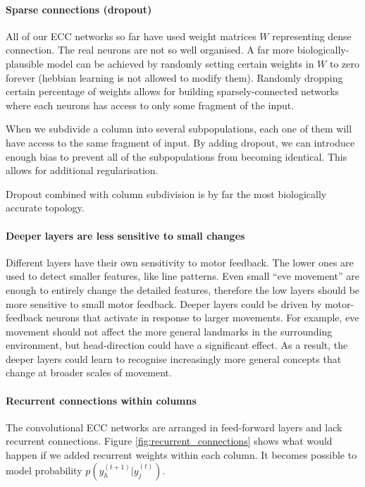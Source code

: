 \documentclass[12pt]{article}
\begin{document}
\paragraph{Sparse connections (dropout)} All of our ECC networks so far have used weight matrices $W$ representing dense connection. The real neurons are not so well organised. A far more biologically-plausible model can be achieved by randomly setting certain weights in $W$ to zero forever (hebbian learning is not allowed to modify them). 
Randomly dropping certain percentage of weights allows for building sparsely-connected networks where each neurons has access to only some fragment of the input. 

When we subdivide a column into several subpopulations, each one of them will have access to the same fragment of input. By adding dropout, we can introduce enough bias to prevent all of the subpopulations from becoming identical. This allows for additional regularisation.

Dropout combined with column subdivision is by far the most biologically accurate topology.

\paragraph{Deeper layers are less sensitive to small changes} 
Different layers have their own sensitivity to motor feedback. The lower ones are used to detect smaller features, like line patterns. Even small ``eve movement'' are enough to entirely change the detailed features, therefore the low layers should be more sensitive to small motor feedback. Deeper layers could be driven by motor-feedback neurons that activate in response to larger movements. For example, eve movement should not affect the more general landmarks in the surrounding environment, but head-direction could have a significant effect. As a result, the deeper  layers could learn to recognise increasingly more general concepts that change at broader scales of movement. 

\paragraph{Recurrent connections within columns}
The convolutional ECC networks are arranged in feed-forward layers and lack recurrent connections. Figure \ref{fig:recurrent_connections} shows what would happen if we added recurrent weights within each column. It becomes possible to model probability $p(y_h^{(t+1)}|y_j^{(t)})$. 
\end{document}
